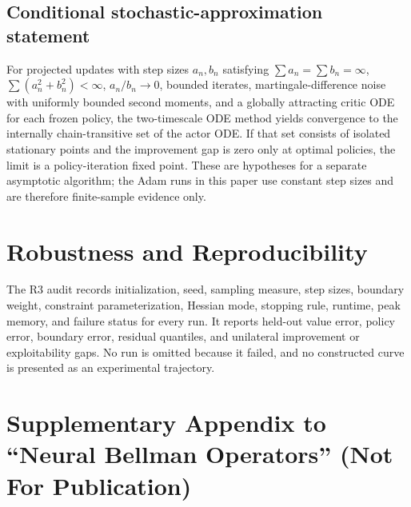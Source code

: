 \documentclass[ecta]{econsocart}
\theoremstyle{plain}
\theoremstyle{remark}
\begin{document}
\begin{appendix}
\subsection{Conditional stochastic-approximation statement}
For projected updates with step sizes $a_n,b_n$ satisfying $\sum a_n=\sum b_n=\infty$, $\sum(a_n^2+b_n^2)<\infty$, $a_n/b_n\to0$, bounded iterates, martingale-difference noise with uniformly bounded second moments, and a globally attracting critic ODE for each frozen policy, the two-timescale ODE method yields convergence to the internally chain-transitive set of the actor ODE. If that set consists of isolated stationary points and the improvement gap is zero only at optimal policies, the limit is a policy-iteration fixed point. These are hypotheses for a separate asymptotic algorithm; the Adam runs in this paper use constant step sizes and are therefore finite-sample evidence only.

\section{Robustness and Reproducibility}
The R3 audit records initialization, seed, sampling measure, step sizes, boundary weight, constraint parameterization, Hessian mode, stopping rule, runtime, peak memory, and failure status for every run. It reports held-out value error, policy error, boundary error, residual quantiles, and unilateral improvement or exploitability gaps. No run is omitted because it failed, and no constructed curve is presented as an experimental trajectory.

\end{appendix}



{}




\clearpage
\section*{Supplementary Appendix to ``Neural Bellman Operators'' (Not For Publication)}\label{sec:olappendix}
\setcounter{equation}{0}
\renewcommand{\theequation}{S\arabic{equation}}
\setcounter{section}{0}
\renewcommand{\thesection}{S\arabic{section}}
\renewcommand{\theHsection}{supp.\arabic{section}}
\renewcommand{\theHsubsection}{supp.\arabic{section}.\arabic{subsection}}
\renewcommand{\theHequation}{supp.\arabic{section}.\arabic{equation}}
\end{document}
